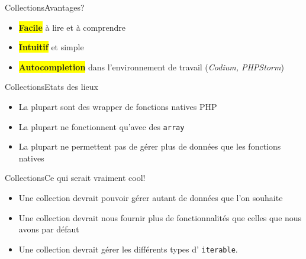 \begin{frame}{Collections}{Avantages?}
    \begin{itemize}[<+->]
        \item \colorbox{yellow}{\textbf{Facile}} à lire et à comprendre
        \item \colorbox{yellow}{\textbf{Intuitif}} et simple
        \item \colorbox{yellow}{\textbf{Autocompletion}} dans l'environnement de travail (\textit{Codium, PHPStorm})
    \end{itemize}
\end{frame}

\begin{frame}{Collections}{Etats des lieux}
    \begin{itemize}[<+->]
        \item La plupart sont des wrapper de fonctions natives PHP
        \item La plupart ne fonctionnent qu'avec des \texttt{array}
        \item La plupart ne permettent pas de gérer plus de données que les
        fonctions natives
    \end{itemize}
\end{frame}

\begin{frame}{Collections}{Ce qui serait vraiment cool!}
    \begin{itemize}[<+->]
        \item Une collection devrait pouvoir gérer autant de données que l'on
        souhaite
        \item Une collection devrait nous fournir plus de fonctionnalités que
        celles que nous avons par défaut
        \item Une collection devrait gérer les différents types d'
        \texttt{iterable}.
    \end{itemize}
\end{frame}
